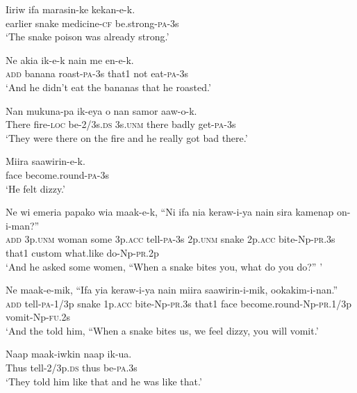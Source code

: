 \ea\label{ex:a:x15}
\gll  Iiriw  ifa  marasin-ke  kekan-e-k. \\
earlier  snake  medicine-\textsc{cf}  be.strong-\textsc{pa}-3s \\
\glt ‘The snake poison was already strong.’ \\
\z


\ea\label{ex:a:x16}
\gll  Ne  akia  ik-e-k  nain  me  en-e-k. \\
\textsc{add}  banana  roast-\textsc{pa}-3s  that1  not  eat-\textsc{pa}-3s \\
\glt ‘And he didn’t eat the bananas that he roasted.’ \\
\z


\ea\label{ex:a:x17}
\gll  Nan  mukuna-pa  ik-eya  o  nan  samor  aaw-o-k. \\
There  fire-\textsc{loc}  be-2/3s.\textsc{ds}  3s.\textsc{unm}  there  badly  get-\textsc{pa}-3s \\
\glt ‘They were there on the fire and he really got bad there.’ \\
\z


\ea\label{ex:a:x18}
\gll  Miira  saawirin-e-k. \\
face  become.round-\textsc{pa}-3s \\
\glt ‘He felt dizzy.’ \\
\z


\ea\label{ex:a:x19}
\gll  Ne  wi  emeria  papako  wia  maak-e-k,  “Ni  ifa       nia  keraw-i-ya  nain  sira  kamenap  on-i-man?” \\
\textsc{add}  3p.\textsc{unm}  woman  some  3p.\textsc{acc}  tell-\textsc{pa}-3s  2p.\textsc{unm}  snake  2p.\textsc{acc}  bite-Np-\textsc{pr}.3s  that1  custom  what.like  do-Np-\textsc{pr}.2p \\


\glt ‘And he asked some women, “When a snake bites you, what do you do?” ’ \\
\z


\ea\label{ex:a:x20}
\gll  Ne  maak-e-mik,  “Ifa  yia  keraw-i-ya  nain      miira  saawirin-i-mik,  ookakim-i-nan.” \\
\textsc{add}  tell-\textsc{pa}-1/3p  snake  1p.\textsc{acc}  bite-Np-\textsc{pr}.3s  that1  face  become.round-Np-\textsc{pr}.1/3p  vomit-Np-\textsc{fu}.2s \\


\glt ‘And the told him, “When a snake bites us, we feel dizzy, you will vomit.’ \\
\z


\ea\label{ex:a:x21}
\gll  Naap  maak-iwkin  naap  ik-ua. \\
Thus  tell-2/3p.\textsc{ds}  thus  be-\textsc{pa}.3s \\
\glt ‘They told him like that and he was like that.’ \\
\z


